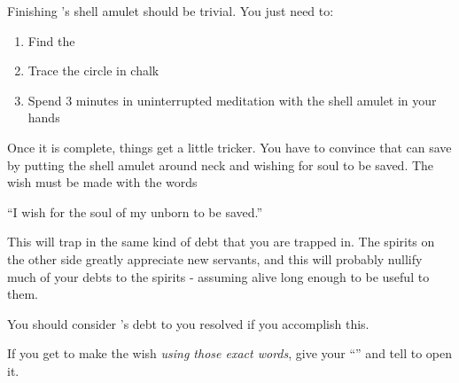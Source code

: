 \documentclass[green]{NeptuneBall}
\begin{document}
\name{\gAmulet{}}

Finishing \cAriel{}'s shell amulet should be trivial. You just need to:
\begin{enumerate}
\item Find the \sRunicCircle{}
\item Trace the circle in chalk
\item Spend 3 minutes in uninterrupted meditation with the shell amulet in your hands
\end{enumerate}

Once it is complete, things get a little tricker. You have to convince \cAriel{} that \cAriel{\they} can save \cAriel{\their} \cArielsSon{\offspring} by putting the shell amulet around \cAriel{\their} neck and wishing for \cArielsSon{\their} soul to be saved. The wish must be made with the words

``I wish for the soul of my unborn \cArielsSon{} to be saved.''

This will trap \cAriel{} in the same kind of debt that you are trapped in. The spirits on the other side greatly appreciate new servants, and this will probably nullify much of your debts to the spirits - assuming \cAriel{\they}  alive long enough to be useful to them.

You should consider \cAriel{}'s debt to you resolved if you accomplish this.

If you get \cAriel{} to make the wish \emph{using those exact words}, give \cAriel{\them} your ``\mMEnvelope{\MYname}'' and tell \cAriel{\them} to open it.
\end{document}
